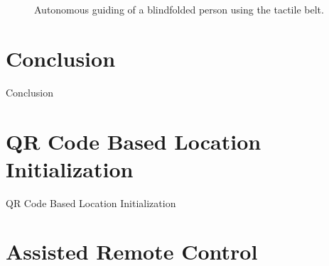\documentclass[12pt]{gatech-thesis}
\begin{document}
\begin{figure}[ht!]
{        }
    \caption{%
	Autonomous guiding of a blindfolded person using the tactile belt.
     }%
   \label{fig:blindguidepics}
\end{figure}





\chapter{Conclusion}
\label{chapter:conclusion}

Conclusion

\appendix
\chapter{QR Code Based Location Initialization}
\label{chapter:qr_code_based_location_initialization}

QR Code Based Location Initialization

\chapter{Assisted Remote Control}
\label{chapter:assisted_remote_control}
\end{document}
